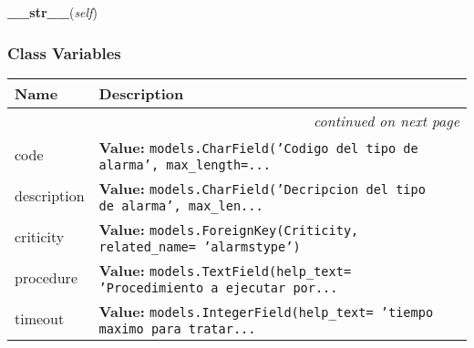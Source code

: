     \label{GroundSegment:models:Alarms:AlarmType:AlarmType:__str__}

    \vspace{0.5ex}

\hspace{.8\funcindent}\begin{boxedminipage}{\funcwidth}

    \raggedright \textbf{\_\_str\_\_}(\textit{self})

\setlength{\parskip}{2ex}
\setlength{\parskip}{1ex}
    \end{boxedminipage}



  \subsubsection{Class Variables}

    \vspace{-1cm}
\hspace{\varindent}\begin{longtable}{|p{\varnamewidth}|p{\vardescrwidth}|l}
\cline{1-2}
\cline{1-2} \centering \textbf{Name} & \centering \textbf{Description}& \\
\cline{1-2}
\endhead\cline{1-2}\multicolumn{3}{r}{\small\textit{continued on next page}}\\\endfoot\cline{1-2}
\endlastfoot\raggedright c\-o\-d\-e\- & \raggedright \textbf{Value:} 
{\tt models.CharField('Codigo del tipo de alarma', max\_length=\texttt{...}}&\\
\cline{1-2}
\raggedright d\-e\-s\-c\-r\-i\-p\-t\-i\-o\-n\- & \raggedright \textbf{Value:} 
{\tt models.CharField('Decripcion del tipo de alarma', max\_len\texttt{...}}&\\
\cline{1-2}
\raggedright c\-r\-i\-t\-i\-c\-i\-t\-y\- & \raggedright \textbf{Value:} 
{\tt models.ForeignKey(Criticity, related\_name= 'alarmstype')}&\\
\cline{1-2}
\raggedright p\-r\-o\-c\-e\-d\-u\-r\-e\- & \raggedright \textbf{Value:} 
{\tt models.TextField(help\_text= 'Procedimiento a ejecutar por\texttt{...}}&\\
\cline{1-2}
\raggedright t\-i\-m\-e\-o\-u\-t\- & \raggedright \textbf{Value:} 
{\tt models.IntegerField(help\_text= 'tiempo maximo para tratar\texttt{...}}&\\
\cline{1-2}
\end{longtable}

